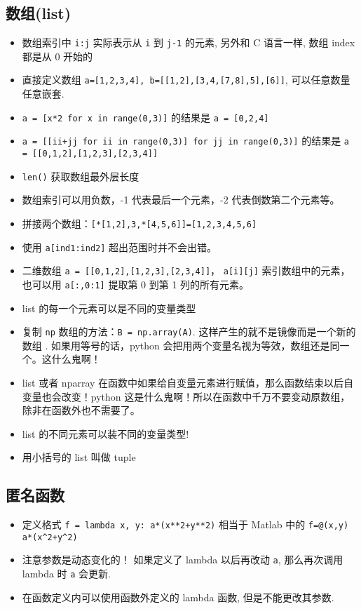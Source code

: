 \subsection{数组(list)}
\begin{itemize}
\item 数组索引中 \verb`i:j` 实际表示从 \verb`i` 到 \verb`j-1` 的元素, 另外和 C 语言一样, 数组 index 都是从 0 开始的
\item 直接定义数组 \verb`a=[1,2,3,4], b=[[1,2],[3,4,[7,8],5],[6]]`, 可以任意数量任意嵌套.
\item \verb`a = [x*2 for x in range(0,3)]` 的结果是 \verb`a = [0,2,4]`
\item \verb`a = [[ii+jj for ii in range(0,3)] for jj in range(0,3)]` 的结果是 \verb`a = [[0,1,2],[1,2,3],[2,3,4]]`
\item \verb`len()` 获取数组最外层长度
\item 数组索引可以用负数，-1 代表最后一个元素，-2 代表倒数第二个元素等。
\item 拼接两个数组：\verb`[*[1,2],3,*[4,5,6]]=[1,2,3,4,5,6]`
\item 使用 \verb`a[ind1:ind2]` 超出范围时并不会出错。
\item 二维数组 \verb`a = [[0,1,2],[1,2,3],[2,3,4]]`， \verb`a[i][j]` 索引数组中的元素，也可以用 \verb`a[:,0:1]` 提取第 0 到第 1 列的所有元素。
\item list 的每一个元素可以是不同的变量类型
\item 复制 \verb`np` 数组的方法：\verb`B = np.array(A)`. 这样产生的就不是镜像而是一个新的数组 . 如果用等号的话，python 会把用两个变量名视为等效，数组还是同一个。这什么鬼啊！
\item list 或者 nparray 在函数中如果给自变量元素进行赋值，那么函数结束以后自变量也会改变！python 这是什么鬼啊！所以在函数中千万不要变动原数组，除非在函数外也不需要了。
\item list 的不同元素可以装不同的变量类型!
\item 用小括号的 list 叫做 tuple
\end{itemize}

\subsection{匿名函数}
\begin{itemize}
\item 定义格式 \verb`f = lambda x, y: a*(x**2+y**2)` 相当于 Matlab 中的 \verb`f=@(x,y) a*(x^2+y^2)`
\item 注意参数是动态变化的！ 如果定义了 lambda 以后再改动 \verb`a`, 那么再次调用 lambda 时 \verb`a` 会更新.
\item 在函数定义内可以使用函数外定义的 lambda 函数, 但是不能更改其参数.
\end{itemize}


